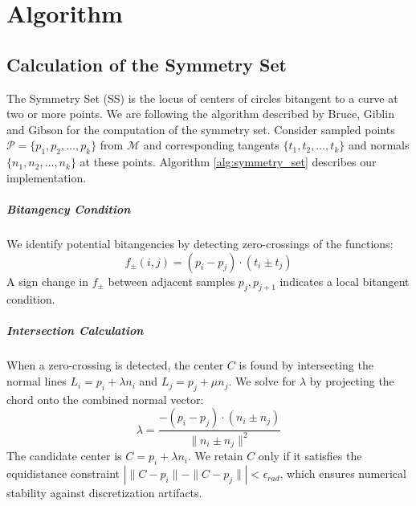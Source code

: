\documentclass[a4paper,english,numberwithinsect]{eurocg26-submission}
\newcommand{\M}{\mathcal{M}}
\begin{document}



\section{Algorithm}

\subsection{Calculation of the Symmetry Set}

The Symmetry Set (SS) is the locus of centers of circles bitangent to a curve at two or more points. We are following the algorithm described by Bruce, Giblin and Gibson \cite{Bruce1985symmetry} for the computation of the symmetry set. Consider sampled points $\mathcal{P}=\{p_1,p_2,\dots, p_k\}$ from $\M$ and corresponding tangents $\{t_1,t_2,\dots,t_k\}$ and normals $\{n_1, n_2,\dots, n_k\}$ at these points. Algorithm \ref{alg:symmetry_set} describes our implementation.

\subparagraph{Bitangency Condition} 
We identify potential bitangencies by detecting zero-crossings of the functions:
\begin{equation}
    f_{\pm}(i, j) = (p_i - p_j) \cdot (t_i \pm t_j)
\end{equation}
A sign change in $f_{\pm}$ between adjacent samples $p_j, p_{j+1}$ indicates a local bitangent condition.

\subparagraph{Intersection Calculation}
When a zero-crossing is detected, the center $C$ is found by intersecting the normal lines $L_i = p_i + \lambda n_i$ and $L_j = p_j + \mu n_j$. We solve for $\lambda$ by projecting the chord onto the combined normal vector:
\begin{equation}
    \lambda = \frac{-(p_i - p_j) \cdot (n_i \pm n_j)}{\|n_i \pm n_j\|^2}
\end{equation}
The candidate center is $C = p_i + \lambda n_i$. We retain $C$ only if it satisfies the equidistance constraint $|\|C-p_i\| - \|C-p_j\|| < \epsilon_{rad}$, which ensures numerical stability against discretization artifacts.
\end{document}
